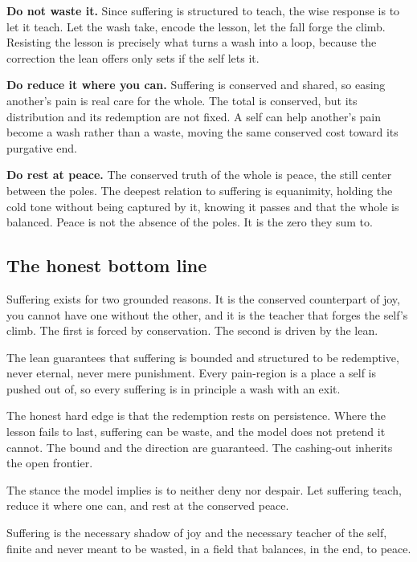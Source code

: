 \textbf{Do not waste it.} Since suffering is structured to teach, the wise response is to let it teach. Let the wash take, encode the lesson, let the fall forge the climb. Resisting the lesson is precisely what turns a wash into a loop, because the correction the lean offers only sets if the self lets it.

\textbf{Do reduce it where you can.} Suffering is conserved and shared, so easing another's pain is real care for the whole. The total is conserved, but its distribution and its redemption are not fixed. A self can help another's pain become a wash rather than a waste, moving the same conserved cost toward its purgative end.

\textbf{Do rest at peace.} The conserved truth of the whole is peace, the still center between the poles. The deepest relation to suffering is equanimity, holding the cold tone without being captured by it, knowing it passes and that the whole is balanced. Peace is not the absence of the poles. It is the zero they sum to.

\subsection{The honest bottom line}

Suffering exists for two grounded reasons. It is the conserved counterpart of joy, you cannot have one without the other, and it is the teacher that forges the self's climb. The first is forced by conservation. The second is driven by the lean.

The lean guarantees that suffering is bounded and structured to be redemptive, never eternal, never mere punishment. Every pain-region is a place a self is pushed out of, so every suffering is in principle a wash with an exit.

The honest hard edge is that the redemption rests on persistence. Where the lesson fails to last, suffering can be waste, and the model does not pretend it cannot. The bound and the direction are guaranteed. The cashing-out inherits the open frontier.

The stance the model implies is to neither deny nor despair. Let suffering teach, reduce it where one can, and rest at the conserved peace.

\begin{result}
Suffering is the necessary shadow of joy and the necessary teacher of the self, finite and never meant to be wasted, in a field that balances, in the end, to peace.
\end{result}
